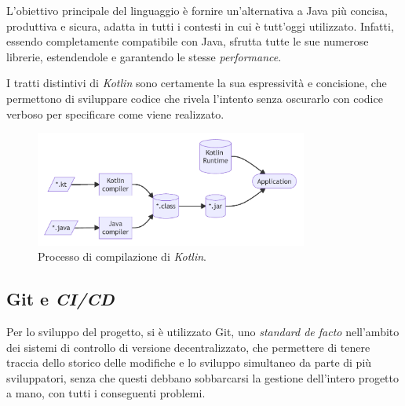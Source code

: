 L'obiettivo principale del linguaggio è fornire un'alternativa a Java più concisa, produttiva e sicura, adatta in tutti i contesti in cui è tutt'oggi utilizzato.
%
Infatti, essendo completamente compatibile con Java, sfrutta tutte le sue numerose librerie, estendendole e garantendo le stesse \textit{performance}.

I tratti distintivi di \textit{Kotlin} sono certamente la sua espressività e concisione, che permettono di sviluppare codice che rivela l'intento senza oscurarlo con codice verboso per specificare come viene realizzato.

\begin{figure}[h]
    \centering
    \includegraphics[width=0.8\textwidth]{resources/img/03-kotlincompilation.pdf}
    \caption{Processo di compilazione di \textit{Kotlin}.}
    \label{img:03-kotlin-compilation}
\end{figure}

\subsection*{Git e \textit{CI/CD}}
\label{03-git-ci}
Per lo sviluppo del progetto, si è utilizzato Git, uno \textit{standard de facto} nell'ambito dei sistemi di controllo di versione decentralizzato, che permettere di tenere traccia dello storico delle modifiche e lo sviluppo simultaneo da parte di più sviluppatori, senza che questi debbano sobbarcarsi la gestione dell'intero progetto a mano, con tutti i conseguenti problemi.


